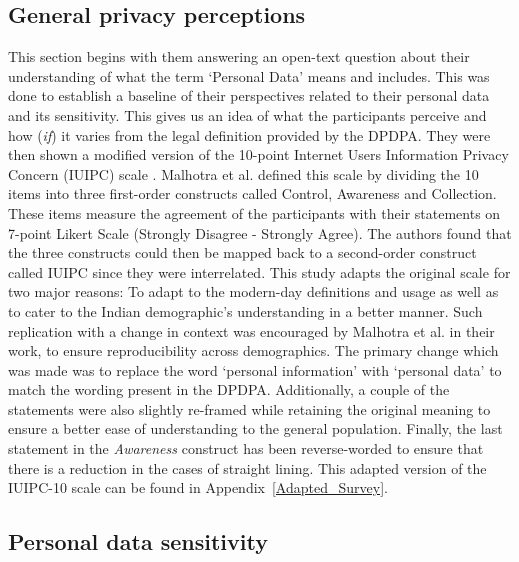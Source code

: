 \subsection{General privacy perceptions} \label{Subsec: IUIPC}

This section begins with them answering an open-text question about their understanding of what the term `Personal Data' means and includes. This was done to establish a baseline of their perspectives related to their personal data and its sensitivity. This gives us an idea of what the participants perceive and how (\textit{if}) it varies from the legal definition provided by the DPDPA. They were then shown a modified version of the 10-point Internet Users Information Privacy Concern (IUIPC) scale \cite{malhotra_internet_2004}. Malhotra et al.\cite{malhotra_internet_2004} defined this scale by dividing the 10 items into three first-order constructs called Control, Awareness and Collection. These items measure the agreement of the participants with their statements on 7-point Likert Scale (Strongly Disagree - Strongly Agree). The authors found that the three constructs could then be mapped back to a second-order construct called IUIPC since they were interrelated. This study adapts the original scale for two major reasons: To adapt to the modern-day definitions and usage as well as to cater to the Indian demographic's understanding in a better manner. Such replication with a change in context was encouraged by Malhotra et al. in their work, to ensure reproducibility across demographics. The primary change which was made was to replace the word `personal information' with `personal data' to match the wording present in the DPDPA. Additionally, a couple of the statements were also slightly re-framed while retaining the original meaning to ensure a better ease of understanding to the general population. Finally, the last statement in the \textit{Awareness} construct has been reverse-worded to ensure that there is a reduction in the cases of straight lining. This adapted version of the IUIPC-10 scale can be found in Appendix~\ref{Adapted_Survey}.

\subsection{Personal data sensitivity} \label{Subsec: PD sensitivity}

